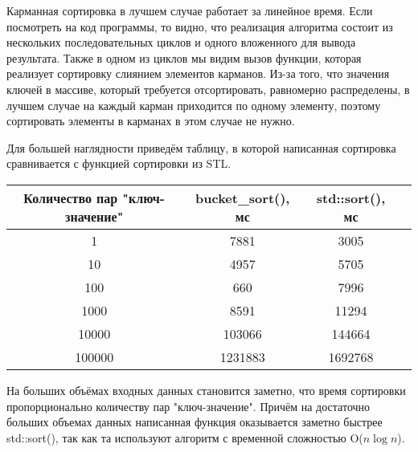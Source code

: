 \documentclass[12pt]{article}
\begin{document}
Карманная сортировка в лучшем случае работает за линейное время. Если посмотреть на код программы, то видно, что реализация алгоритма состоит из нескольких последовательных циклов и одного вложенного для вывода результата. Также в одном из циклов мы видим вызов функции, которая реализует сортировку слиянием элементов карманов. Из-за того, что значения ключей в массиве, который требуется отсортировать, равномерно распределены, в лучшем случае на каждый карман приходится по одному элементу, поэтому сортировать элементы в карманах в этом случае не нужно.

Для большей наглядности приведём таблицу, в которой написанная сортировка сравнивается с функцией сортировки из STL.

\begin{center}
\begin{tabular}{ |c|c|c|c| }
    \hline
    Количество пар "ключ-значение" & bucket\_sort(), мс & std::sort(), мс\\
    \hline
    1 & 7881 & 3005\\
    10 & 4957 & 5705\\
    100 & 660 & 7996\\
    1000 & 8591 & 11294\\
    10000 & 103066 & 144664\\
    100000 & 1231883 & 1692768\\
    \hline
    \end{tabular}
\end{center}

На больших объёмах входных данных становится заметно, что время сортировки пропорционально количеству пар "ключ-значение". Причём на достаточно больших объемах данных написанная функция оказывается заметно быстрее std::sort(), так как та используют алгоритм с временной сложностью O($n \log{n}$).
\end{document}

